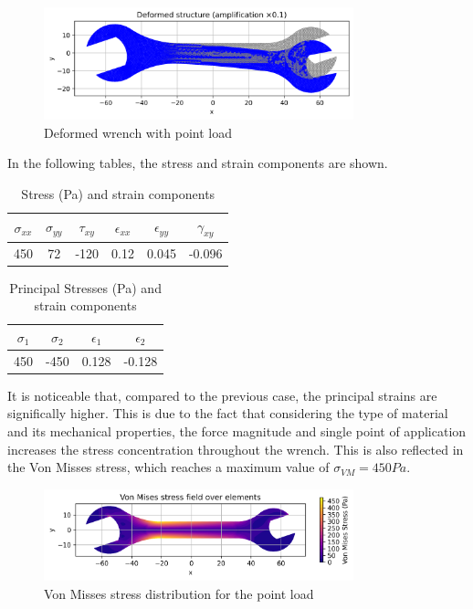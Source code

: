 \begin{figure}[H]
    \centering
    \includegraphics[width=0.8\textwidth]{GRAFICOS/Case a_deformada.png}
    \caption{Deformed wrench with point load}
    \label{fig:xdi}
\end{figure}

In the following tables, the stress and strain components are shown.

\begin{table}[H]
    \centering
    \caption{Stress (Pa) and strain components}
    \begin{tabular}{|c|c|c|c|c|c|}
    \hline
    $\sigma_{xx}$ & $\sigma_{yy}$ & $\tau_{xy}$ & $\epsilon_{xx}$ & $\epsilon_{yy}$ & $\gamma_{xy}$ \\
    \hline
    450 & 72 & -120 & 0.12 & 0.045 & -0.096 \\
    \hline
    \end{tabular}
    \label{tab:tabla1}
\end{table}
    
\begin{table}[H]
    \centering
    \caption{Principal Stresses (Pa) and strain components}
    \begin{tabular}{|c|c|c|c|}
    \hline
    $\sigma_{1}$ & $\sigma_{2}$ & $\epsilon_{1}$ & $\epsilon_{2}$ \\
    \hline
    450 & -450 & 0.128 & -0.128 \\
    \hline
    \end{tabular}
    \label{tab:tabla2}
\end{table}


It is noticeable that, compared to the previous case, the principal strains are significally higher. This is due to the fact that considering the type of material and its mechanical properties, the force magnitude and single point of application increases the stress concentration throughout the wrench. This is also reflected in the Von Misses stress, which reaches a maximum value of $\sigma_{VM} = 450 Pa$.

\begin{figure}[H]
    \centering
    \includegraphics[width=0.8\textwidth]{GRAFICOS/Case a_von_mises.png}
    \caption{Von Misses stress distribution for the point load}
    \label{fig:principal}
\end{figure}

